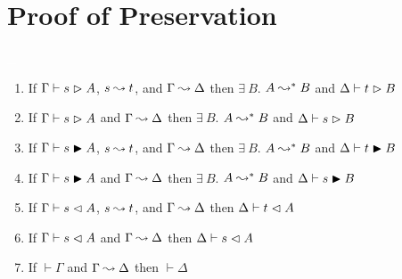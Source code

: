 \chapter{Proof of Preservation}
\label{ap:b}

\begin{lemma}
    \textcolor{white}{\_}
    \begin{enumerate}
        \item If $\Gamma \vdash s \vartriangleright A$, $s \leadsto t$, and $\Gamma \leadsto \Delta$ then $\exists\ B.$ $A \leadsto^* B$ and $\Delta \vdash t \vartriangleright B$
        \item If $\Gamma \vdash s \vartriangleright A$ and $\Gamma \leadsto \Delta$ then $\exists\ B.$ $A \leadsto^* B$ and $\Delta \vdash s \vartriangleright B$
        \item If $\Gamma \vdash s \blacktriangleright A$, $s \leadsto t$, and $\Gamma \leadsto \Delta$ then $\exists\ B.$ $A \leadsto^* B$ and $\Delta \vdash t \blacktriangleright B$
        \item If $\Gamma \vdash s \blacktriangleright A$ and $\Gamma \leadsto \Delta$ then $\exists\ B.$ $A \leadsto^* B$ and $\Delta \vdash s \blacktriangleright B$
        \item If $\Gamma \vdash s \vartriangleleft A$, $s \leadsto t$, and $\Gamma \leadsto \Delta$ then $\Delta \vdash t \vartriangleleft A$
        \item If $\Gamma \vdash s \vartriangleleft A$ and $\Gamma \leadsto \Delta$ then $\Delta \vdash s \vartriangleleft A$
        \item If $\vdash \Gamma$ and $\Gamma \leadsto \Delta$ then $\vdash \Delta$
    \end{enumerate}
    \label{lem:b:preservation_step}
\end{lemma}
